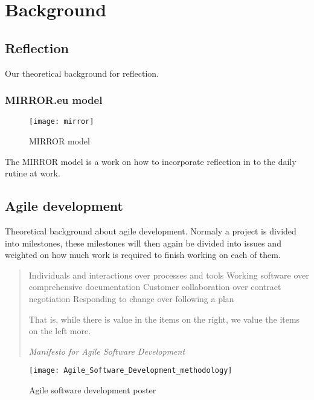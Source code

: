 \chapter{Background}

\section{Reflection}
Our theoretical background for reflection.
\subsection{MIRROR.eu model}

\begin{figure}[h!]
\label{logo}
\centering
	\texttt{[image: mirror]}
\caption{MIRROR model}
\end{figure}
The MIRROR model is a work on how to incorporate reflection in to the daily rutine at work.


\section{Agile development}
Theoretical background about agile development. Normaly a project is divided into milestones, these milestones will then again be divided into issues and weighted on how much work is required to finish working on each of them.

\begin{quotation}
Individuals and interactions over processes and tools
Working software over comprehensive documentation
Customer collaboration over contract negotiation
Responding to change over following a plan

That is, while there is value in the items on
the right, we value the items on the left more.

\em Manifesto for Agile Software Development
\end{quotation}

\begin{figure}[h!]
\label{logo}
\centering
	\texttt{[image: Agile\_Software\_Development\_methodology]}
\caption{Agile software development poster}
\end{figure}

